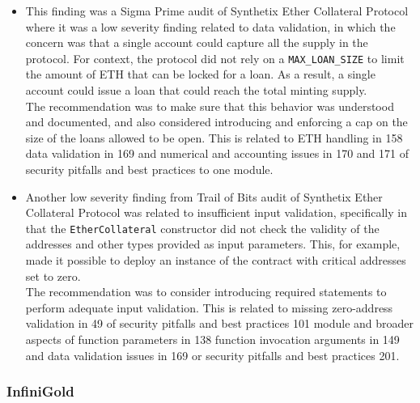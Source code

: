 \begin{itemize}
\item
  This finding was a Sigma Prime audit of Synthetix Ether Collateral
  Protocol where it was a low severity finding related to data
  validation, in which the concern was that a single account could
  capture all the supply in the protocol. For context, the protocol did
  not rely on a \texttt{MAX\_LOAN\_SIZE} to limit the amount of ETH that
  can be locked for a loan. As a result, a single account could issue a
  loan that could reach the total minting supply.\\

  The recommendation was to make sure that this behavior was understood
  and documented, and also considered introducing and enforcing a cap on
  the size of the loans allowed to be open. This is related to ETH
  handling in 158 data validation in 169 and numerical and accounting
  issues in 170 and 171 of security pitfalls and best practices to one
  module.
\item
  Another low severity finding from Trail of Bits audit of Synthetix
  Ether Collateral Protocol was related to insufficient input
  validation, specifically in that the \texttt{EtherCollateral}
  constructor did not check the validity of the addresses and other
  types provided as input parameters. This, for example, made it
  possible to deploy an instance of the contract with critical addresses
  set to zero.\\

  The recommendation was to consider introducing required statements to
  perform adequate input validation. This is related to missing
  zero-address validation in 49 of security pitfalls and best practices
  101 module and broader aspects of function parameters in 138 function
  invocation arguments in 149 and data validation issues in 169 or
  security pitfalls and best practices 201.
\end{itemize}

\subsubsection{InfiniGold}\label{infinigold}

